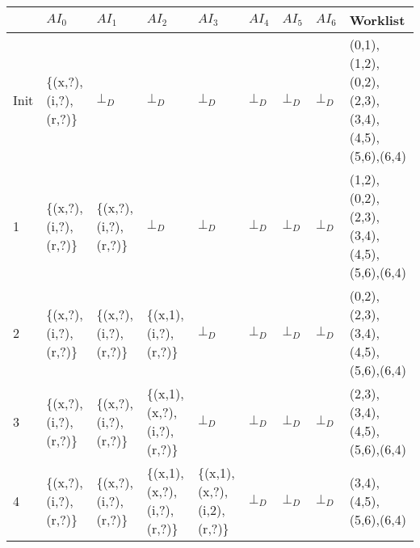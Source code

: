\documentclass[]{article}
\begin{document}
	\begin{sidewaystable}
		\begin{tabularx}{\textwidth}{|l|X|X|X|X|X|X|X|X|}
			\hline 
			& $AI_0$  & $AI_1$ & $AI_2$ & $AI_3$ & $AI_4$ &  $AI_5$ & $AI_6$ & Worklist \\ 
			\hline 
			Init & \{(x,?),(i,?),\newline(r,?)\} & $\bot_D$ & $\bot_D$ & $\bot_D$ & $\bot_D$ & $\bot_D$ & $\bot_D$ & (0,1),(1,2),\newline(0,2),(2,3),\newline(3,4),(4,5),\newline(5,6),(6,4)\\ 
			\hline 
			1 & \{(x,?),(i,?),\newline(r,?)\} & \{(x,?),(i,?),\newline(r,?)\} & $\bot_D$ & $\bot_D$ & $\bot_D$ & $\bot_D$ & $\bot_D$ & (1,2),(0,2),\newline(2,3),(3,4),\newline(4,5),(5,6),\newline(6,4)\\ 
			\hline  
			2 & \{(x,?),(i,?),\newline(r,?)\} & \{(x,?),(i,?),\newline(r,?)\} & \{(x,1),\newline(i,?),(r,?)\} & $\bot_D$ & $\bot_D$ & $\bot_D$ & $\bot_D$ &  (0,2),(2,3),\newline(3,4),(4,5),\newline(5,6),(6,4)\\ 
			\hline 
			3 & \{(x,?),(i,?),\newline(r,?)\} & \{(x,?),(i,?),\newline(r,?)\} & \{(x,1),\newline(x,?),\newline(i,?),(r,?)\} & $\bot_D$ & $\bot_D$ & $\bot_D$ & $\bot_D$ & (2,3),(3,4),\newline(4,5),(5,6),\newline(6,4)\\ 
			\hline 
			4 & \{(x,?),(i,?),\newline(r,?)\} & \{(x,?),(i,?),\newline(r,?)\} & \{(x,1),(x,?),\newline(i,?),\newline(r,?)\} & \{(x,1),(x,?),\newline\newline(i,2),(r,?)\} & $\bot_D$ & $\bot_D$ & $\bot_D$ & 
			(3,4),(4,5),\newline(5,6),(6,4)\\ 

\end{tabularx}
\end{sidewaystable}
\end{document}
